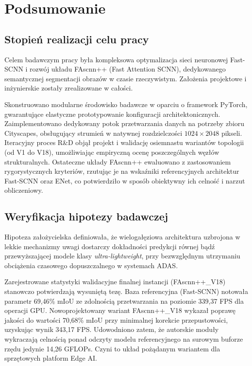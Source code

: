 \chapter{Podsumowanie}

\section{Stopień realizacji celu pracy}
Celem badawczym pracy była kompleksowa optymalizacja sieci neuronowej Fast-SCNN i rozwój układu FAscnn++ (Fast Attention SCNN), dedykowanego semantycznej segmentacji obrazów w czasie rzeczywistym. Założenia projektowe i inżynierskie zostały zrealizowane w całości.

Skonstruowano modularne środowisko badawcze w oparciu o framework PyTorch, gwarantujące elastyczne prototypowanie konfiguracji architektonicznych. Zaimplementowano dedykowany potok przetwarzania danych na potrzeby zbioru Cityscapes, obsługujący strumień w natywnej rozdzielczości $1024 \times 2048$ pikseli. Iteracyjny proces R\&D objął projekt i walidację osiemnastu wariantów topologii (od V1 do V18), umożliwiając empiryczną ocenę poszczególnych węzłów strukturalnych. Ostateczne układy FAscnn++ ewaluowano z zastosowaniem rygorystycznych kryteriów, rzutując je na wskaźniki referencyjnych architektur Fast-SCNN oraz ENet, co potwierdziło w sposób obiektywny ich celność i narzut obliczeniowy.

\section{Weryfikacja hipotezy badawczej}
Hipoteza założycielska definiowała, że wielogałęziowa architektura uzbrojona w lekkie mechanizmy uwagi dostarczy dokładności predykcji równej bądź przewyższającej modele klasy \textit{ultra-lightweight}, przy bezwzględnym utrzymaniu obciążenia czasowego dopuszczalnego w systemach ADAS.

Zarejestrowane statystyki walidacyjne finalnej instancji (FAscnn++\_V18) stanowczo potwierdzają wysuniętą tezę. Baza referencyjna (Fast-SCNN) notowała parametr 69,46\% mIoU ze zdolnością przetwarzania na poziomie 339,37 FPS dla operacji GPU. Nowoprojektowany wariant FAscnn++\_V18 wykazał poprawę jakości do wartości 70,68\% mIoU przy minimalnej korekcie przepustowości, uzyskując wynik 343,17 FPS. Udowodniono zatem, że autorskie moduły wykraczają celnością ponad odczyty modelu referencyjnego na surowym buforze rzędu jedynie 14,26 GFLOPs. Czyni to układ pożądanym wariantem dla sprzętowych platform Edge AI.

